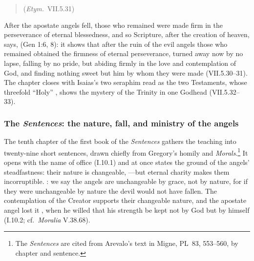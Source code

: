 \begin{quote}
 (\emph{Etym.}\ VII.5.31)
\end{quote}

\noindent After the apostate angels fell, those who remained were made firm
in the perseverance of eternal blessedness, and so Scripture, after the
creation of heaven, says,  (Gen 1:6, 8): it shows that after the ruin of the evil
angels those who remained obtained the firmness of eternal perseverance,
turned away now by no lapse, falling by no pride, but abiding firmly in the
love and contemplation of God, and finding nothing sweet but him by whom they
were made (VII.5.30--31). The chapter closes with Isaias's two seraphim read
as the two Testaments, whose threefold ``Holy'' , shows the mystery of the Trinity in one
Godhead (VII.5.32--33).

\subsubsection{The \emph{Sentences}: the nature, fall, and ministry of the
angels}

The tenth chapter of the first book of the \emph{Sentences} gathers the
teaching into twenty-nine short sentences, drawn chiefly from Gregory's
homily and \emph{Morals}.\footnote{The \emph{Sentences} are cited from
Arevalo's text in Migne, PL~83, 553--560, by chapter and sentence.} It
opens with the name of office (I.10.1) and at once states the ground of the
angels' steadfastness: their nature is changeable, ---but eternal charity makes them
incorruptible. : we say the angels are unchangeable by grace, not by nature, for
if they were unchangeable by nature the devil would not have fallen. The
contemplation of the Creator supports their changeable nature, and the
apostate angel lost it , when he willed that his strength be kept not by God but
by himself (I.10.2; cf.\ \emph{Moralia} V.38.68).

